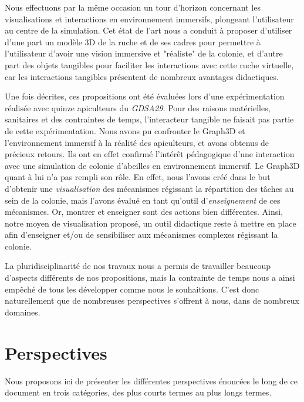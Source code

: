 Nous effectuons par la même occasion un tour d'horizon concernant les visualisations et interactions en environnement immersifs, plongeant l'utilisateur au centre de la simulation. Cet état de l'art nous a conduit à proposer d'utiliser d'une part un modèle 3D de la ruche et de ses cadres pour permettre à l'utilisateur d'avoir une vision immersive et "réaliste" de la colonie, et d'autre part des objets tangibles pour faciliter les interactions avec cette ruche virtuelle, car les interactions tangibles présentent de nombreux avantages didactiques.

Une fois décrites, ces propositions ont été évaluées lors d'une expérimentation réalisée avec quinze apiculteurs du \textit{GDSA29}. Pour des raisons matérielles, sanitaires et des contraintes de temps, l'interacteur tangible ne faisait pas partie de cette expérimentation. Nous avons pu confronter le Graph3D et l'environnement immersif à la réalité des apiculteurs, et avons obtenus de précieux retours. Ils ont en effet confirmé l'intérêt pédagogique d'une interaction avec une simulation de colonie d'abeilles en environnement immersif. Le Graph3D quant à lui n'a pas rempli son rôle. En effet, nous l'avons créé dans le but d'obtenir une \textit{visualisation} des mécanismes régissant la répartition des tâches au sein de la colonie, mais l'avons évalué en tant qu'outil d'\textit{enseignement} de ces mécanismes. Or, montrer et enseigner sont des actions bien différentes. Ainsi, notre moyen de visualisation proposé, un outil didactique reste à mettre en place afin d'enseigner et/ou de sensibiliser aux mécanismes complexes régissant la colonie.
	
	 La pluridisciplinarité de nos travaux nous a permis de travailler beaucoup d'aspects différents de nos propositions, mais la contrainte de temps nous a ainsi empêché de tous les développer comme nous le souhaitions. C'est donc naturellement que de nombreuses perspectives s'offrent à nous, dans de nombreux domaines.
	
\section*{Perspectives}
	Nous proposons ici de présenter les différentes perspectives énoncées le long de ce document en trois catégories, des plus courts termes au plus longs termes.
	
